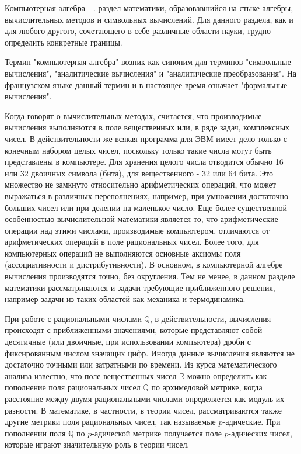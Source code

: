 \documentclass[master, och, diploma, times]{sty/SCWorks}
\theoremstyle{plain}
\theoremstyle{definition}
\numberwithin{equation}{section}
\begin{document}
\intro

Компьютерная алгебра - . раздел математики, образовавшийся на стыке алгебры, вычислительных методов и символьных вычислений. Для данного раздела, как и для любого другого, сочетающего в себе различные области науки, трудно определить конкретные границы.

Термин "компьютерная алгебра" возник как синоним для терминов "символьные вычисления", "аналитические вычисления" и "аналитические преобразования". На французском языке данный термин и в настоящее время означает "формальные вычисления".

Когда говорят о вычислительных методах, считается, что производимые вычисления выполняются в поле вещественных или, в ряде задач, комплексных чисел. В действительности же всякая программа для ЭВМ имеет дело только с конечным набором целых чисел, поскольку только такие числа могут быть представлены в компьютере. Для хранения целого числа отводится обычно 16 или 32 двоичных символа (бита), для вещественного - 32 или 64 бита. Это множество не замкнуто относительно арифметических операций, что может выражаться в различных переполнениях, например, при умножении достаточно больших чисел или при делении на маленькое число. Еще более  существенной особенностью вычислительной математики является то, что арифметические операции над этими числами, производимые компьютером, отличаются от арифметических операций в поле рациональных чисел. Более того, для компьютерных операций не выполняются основные аксиомы поля (ассоциативности и дистрибутивности). В основном, в компьютерной алгебре вычисления производятся точно, без округления. Тем не менее, в данном разделе математики рассматриваются и задачи требующие приближенного решения, например задачи из таких областей как механика и термодинамика. 
 
При работе с рациональными числами $\mathbb{Q}$, в действительности, вычисления происходят с приближенными значениями, которые представляют собой десятичные (или двоичные, при использовании компьютера) дроби с фиксированным числом значащих цифр.  Иногда данные вычисления являются не достаточно точными или затратными по времени. 
Из курса математического анализа известно, что поле вещественных чисел $\mathbb{R}$ можно определить как пополнение поля рациональных чисел $\mathbb{Q}$ по архимедовой метрике, когда расстояние между двумя рациональными числами определяется как модуль их разности. В математике, в частности, в теории чисел, рассматриваются также другие метрики поля рациональных чисел, так называемые $p$-адические. При пополнении поля $\mathbb{Q}$ по $p$-адической метрике получается поле $p$-адических чисел, которые играют значительную роль в теории чисел.
 
\end{document}
